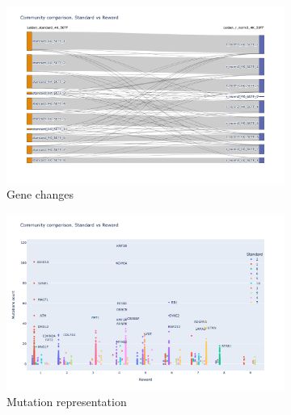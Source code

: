 \begin{figure}[!htb]
    \hfill
    \begin{subfigure}[b]{0.49\textwidth}
        \centering
        \includegraphics[width=\textwidth,keepaspectratio]{Sections/Network_I/Resources/P0/Comms/Sky_Comm_Comp_4K.png}
        \caption{Gene changes}
    \end{subfigure}
    \hfill
     \begin{subfigure}[b]{0.49\textwidth}
            \centering
            \includegraphics[width=\textwidth,keepaspectratio]{Sections/Network_I/Resources/P0/Comms/Mut_Comm_Comp_4K.png}
            \caption{Mutation representation}
    \end{subfigure}
    \hfill
    \hfill
    \begin{subfigure}[b]{0.47\textwidth}
        \centering

\end{subfigure}
\end{figure}
